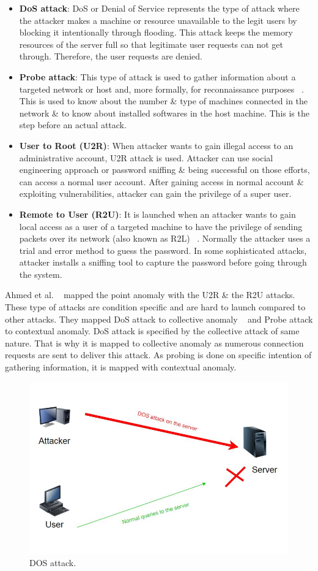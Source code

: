 \begin{itemize}
    \item \textbf{DoS attack}: DoS or Denial of Service represents the type of attack where the attacker makes a machine or resource unavailable to the legit users by blocking it intentionally through flooding. This attack keeps the memory resources of the server full so that legitimate user requests can not get through. Therefore, the user requests are denied.
    \item \textbf{Probe attack}: This type of attack is used to gather information about a targeted network or host and, more formally, for reconnaissance purposes ~\cite{ahmed2016survey}. This is used to know about the number \& type of machines connected in the network \& to know about installed softwares in the host machine. This is the step before an actual attack.
    \item \textbf{User to Root (U2R)}: When attacker wants to gain illegal access to an administrative account, U2R attack is used. Attacker can use social engineering approach or password sniffing \& being successful on those efforts, can access a normal user account. After gaining access in normal account \& exploiting vulnerabilities, attacker can gain the privilege of a super user.
    \item \textbf{Remote to User (R2U)}: It is launched when an attacker wants to gain local access as a user of a targeted machine to have the privilege of sending packets over its network (also known as R2L) ~\cite{ahmed2016survey}. Normally the attacker uses a trial and error method to guess the password. In some sophisticated attacks, attacker installs a sniffing tool to capture the password before going through the system.
\end{itemize}

Ahmed et al. ~\cite{ahmed2016survey} mapped the point anomaly with the U2R \& the R2U attacks. These type of attacks are condition specific and are hard to launch compared to other attacks. They mapped DoS attack to collective anomaly ~\cite{ahmed2014network} and Probe attack to contextual anomaly. DoS attack is specified by the collective attack of same nature. That is why it is mapped to collective anomaly as numerous connection requests are sent to deliver this attack. As probing is done on specific intention of gathering information, it is mapped with contextual anomaly.

\begin{figure}[b]
  \includegraphics[width=\linewidth]{DOS2.JPG}
  \caption{DOS attack.}
  \label{fig:DOS}
\end{figure}


